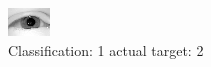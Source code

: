 \begin{figure}[h!]
\begin{center}
\includegraphics[width=0.60\columnwidth]{figures/ID2309_class_1_target_2.png}
\end{center}
\caption{ Classification: 1 actual target: 2}
\label{fig:ID2309_class_1_target_2}
\end{figure}
